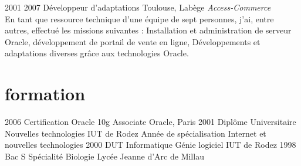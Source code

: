 \documentclass{friggeri-cv} 	%
\begin{document}
\begin{entrylist}
\entry
{2001  2007}
{Développeur d'adaptations}
{Toulouse, Labège}
{\vspace{0.2cm}\emph{Access-Commerce}  \\
En tant que ressource technique d’une équipe de sept personnes, j’ai, entre autres, effectué les
missions suivantes : Installation et administration de serveur Oracle, développement de portail de vente en ligne, 
Développements et adaptations diverses grâce aux technologies Oracle.
}
\end{entrylist}


\section{formation}

\begin{entrylist}
\entry
{2006}
{Certification Oracle {\normalfont 10g Associate}}
{Oracle, Paris}
{}
\entry
{2001}
{Diplôme Universitaire {\normalfont Nouvelles technologies}}
{IUT de Rodez}
{Année de spécialisation Internet et nouvelles technologies}
\entry
{2000}
{DUT {\normalfont Informatique Génie logiciel}}
{IUT de Rodez}
{}
\entry
{1998}
{Bac S {\normalfont Spécialité Biologie}}
{Lycée Jeanne d’Arc de Millau}
{}
\end{entrylist}

\end{document}
